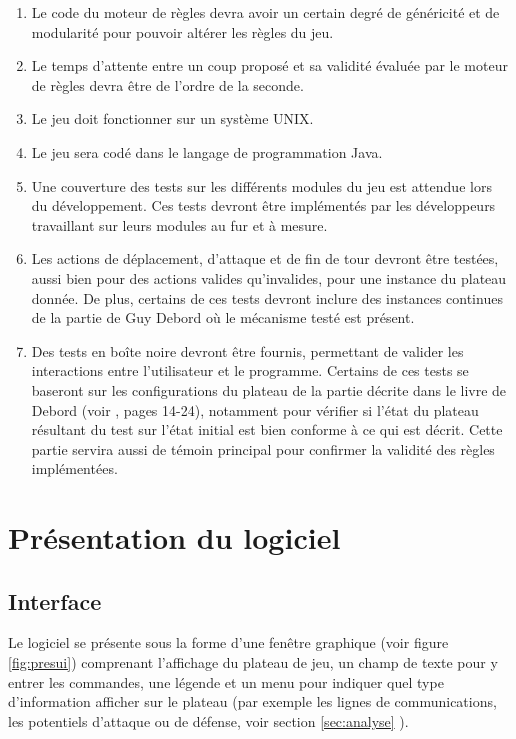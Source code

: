 \documentclass[a4paper]{report}
\begin{document}
\begin{enumerate}
\item Le code du moteur de règles devra avoir un certain degré de généricité et de modularité pour pouvoir altérer les règles du jeu.

\item Le temps d'attente entre un coup proposé et sa validité évaluée par le moteur de règles devra être de l'ordre de la seconde.

\item Le jeu doit fonctionner sur un système UNIX.

\item Le jeu sera codé dans le langage de programmation Java.

\item Une couverture des tests sur les différents modules du jeu est attendue lors du développement. Ces tests devront être implémentés par les développeurs travaillant sur leurs modules au fur et à mesure.

\item Les actions de déplacement, d'attaque et de fin de tour devront être testées, aussi bien pour des actions valides qu'invalides, pour une instance du plateau donnée. De plus, certains de ces tests devront inclure des instances continues de la partie de Guy Debord où le mécanisme testé est présent.

\item Des tests en boîte noire devront être fournis, permettant de valider les interactions entre l'utilisateur et le programme. Certains de ces tests se baseront sur les configurations du plateau de la partie décrite dans le livre de Debord (voir \cite{jdg}, pages 14-24), notamment pour vérifier si l'état du plateau résultant du test sur l'état initial est bien conforme à ce qui est décrit. Cette partie servira aussi de témoin principal pour confirmer la validité des règles implémentées.

\end{enumerate}

\chapter{Présentation du logiciel}
\section{Interface}
Le logiciel se présente sous la forme d'une fenêtre graphique (voir figure \ref{fig:presui}) comprenant l'affichage du plateau de jeu, un champ de texte pour y entrer les commandes, une légende et un menu pour indiquer quel type d'information afficher sur le plateau (par exemple les lignes de communications, les potentiels d'attaque ou de défense, voir section \ref{sec:analyse} ).
\end{document}
